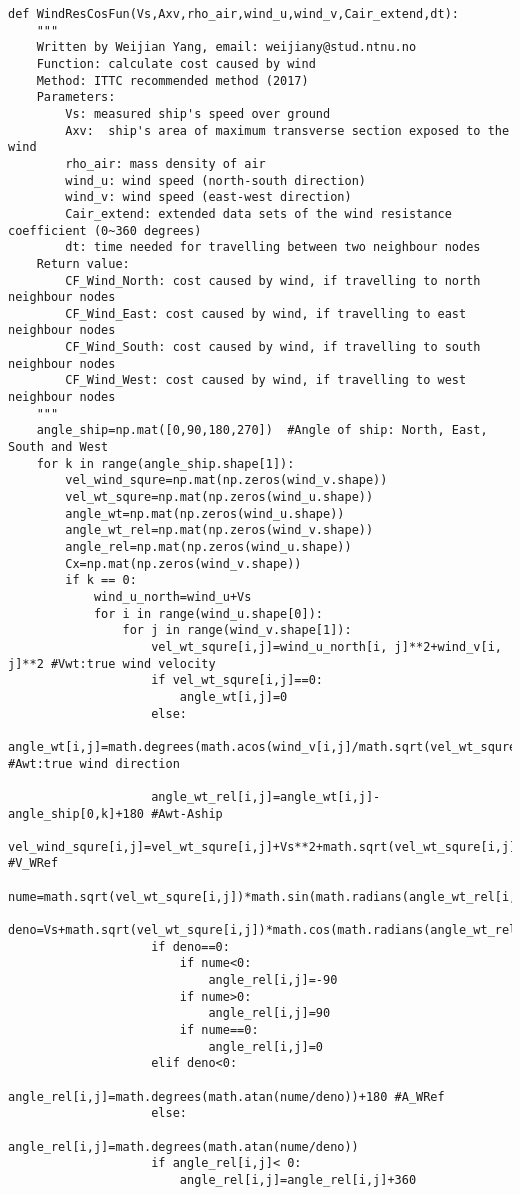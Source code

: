 \begin{lstlisting}[caption=Function for calculating cost caused by wind (parts of code)(\autoref{Cost Wind}), label=calcostwind]
def WindResCosFun(Vs,Axv,rho_air,wind_u,wind_v,Cair_extend,dt):
    """     
    Written by Weijian Yang, email: weijiany@stud.ntnu.no
    Function: calculate cost caused by wind
    Method: ITTC recommended method (2017)
    Parameters:
        Vs: measured ship's speed over ground
        Axv:  ship's area of maximum transverse section exposed to the wind
        rho_air: mass density of air
        wind_u: wind speed (north-south direction)
        wind_v: wind speed (east-west direction)
        Cair_extend: extended data sets of the wind resistance coefficient (0~360 degrees)
        dt: time needed for travelling between two neighbour nodes
    Return value:
        CF_Wind_North: cost caused by wind, if travelling to north neighbour nodes
        CF_Wind_East: cost caused by wind, if travelling to east neighbour nodes
        CF_Wind_South: cost caused by wind, if travelling to south neighbour nodes
        CF_Wind_West: cost caused by wind, if travelling to west neighbour nodes
    """
    angle_ship=np.mat([0,90,180,270])  #Angle of ship: North, East, South and West
    for k in range(angle_ship.shape[1]):
        vel_wind_squre=np.mat(np.zeros(wind_v.shape))
        vel_wt_squre=np.mat(np.zeros(wind_u.shape))
        angle_wt=np.mat(np.zeros(wind_u.shape))
        angle_wt_rel=np.mat(np.zeros(wind_v.shape))
        angle_rel=np.mat(np.zeros(wind_u.shape))
        Cx=np.mat(np.zeros(wind_v.shape))
        if k == 0:
            wind_u_north=wind_u+Vs
            for i in range(wind_u.shape[0]):
                for j in range(wind_v.shape[1]):
                    vel_wt_squre[i,j]=wind_u_north[i, j]**2+wind_v[i, j]**2 #Vwt:true wind velocity
                    if vel_wt_squre[i,j]==0:
                        angle_wt[i,j]=0
                    else:
                        angle_wt[i,j]=math.degrees(math.acos(wind_v[i,j]/math.sqrt(vel_wt_squre[i,j]))) #Awt:true wind direction
                    
                    angle_wt_rel[i,j]=angle_wt[i,j]-angle_ship[0,k]+180 #Awt-Aship
                    vel_wind_squre[i,j]=vel_wt_squre[i,j]+Vs**2+math.sqrt(vel_wt_squre[i,j])*Vs*math.cos(math.radians(angle_wt_rel[i,j])) #V_WRef
                    nume=math.sqrt(vel_wt_squre[i,j])*math.sin(math.radians(angle_wt_rel[i,j]))
                    deno=Vs+math.sqrt(vel_wt_squre[i,j])*math.cos(math.radians(angle_wt_rel[i,j]))
                    if deno==0:
                        if nume<0:
                            angle_rel[i,j]=-90
                        if nume>0:
                            angle_rel[i,j]=90
                        if nume==0:
                            angle_rel[i,j]=0
                    elif deno<0:
                        angle_rel[i,j]=math.degrees(math.atan(nume/deno))+180 #A_WRef
                    else:
                        angle_rel[i,j]=math.degrees(math.atan(nume/deno))
                    if angle_rel[i,j]< 0:
                        angle_rel[i,j]=angle_rel[i,j]+360
                    

\end{lstlisting}
